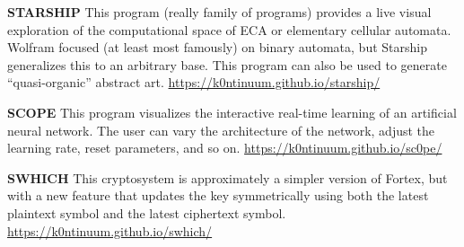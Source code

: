 \documentclass{article}
\renewcommand{\b}{\textbf}
\newcommand{\q}{\enquote}
\begin{document}
{{\b{STARSHIP} \quad This program (really family of programs) provides a live visual exploration of the computational space of ECA or elementary cellular automata. Wolfram focused (at least most famously) on binary automata, but Starship generalizes this to an arbitrary base. This program can also be used to generate \q{quasi-organic} abstract art. \quad \url{https://k0ntinuum.github.io/starship/}

\b{SCOPE} \quad This program visualizes the interactive real-time learning of an artificial neural network. The user can vary the architecture of the network, adjust the learning rate, reset parameters, and so on. \url{https://k0ntinuum.github.io/sc0pe/} 

\b{SWHICH} \quad This cryptosystem is approximately a simpler version of Fortex, but with a new feature that updates the key symmetrically using both the latest plaintext symbol and the latest ciphertext symbol.
\url{https://k0ntinuum.github.io/swhich/} 





}}
\end{document}
